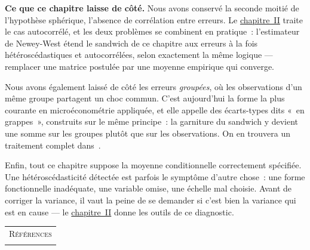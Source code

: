 \documentclass[10pt,a4paper]{article}
\newcommand{\siteurl}{https://le-mans.adjemian.eu/econometrics}
\newcommand{\chapref}[2]{\href{\siteurl/chapitre-#1.pdf}{chapitre~#2}}
\theoremstyle{definition}
\begin{document}
\begin{notes}

  \textbf{Ce que ce chapitre laisse de côté.} Nous avons conservé la seconde
  moitié de l'hypothèse sphérique, l'absence de corrélation entre erreurs. Le
  \chapref{2}{II} traite le cas autocorrélé, et les deux problèmes se combinent
  en pratique~: l'estimateur de Newey-West étend le sandwich de ce chapitre aux
  erreurs à la fois hétéroscédastiques et autocorrélées, selon exactement la
  même logique — remplacer une matrice postulée par une moyenne empirique qui
  converge.

  \bigskip

  Nous avons également laissé de côté les erreurs \emph{groupées}, où les
  observations d'un même groupe partagent un choc commun. C'est aujourd'hui la
  forme la plus courante en microéconométrie appliquée, et elle appelle des
  écarts-types dits «~en grappes~», construits sur le même principe~: la
  garniture du sandwich y devient une somme sur les groupes plutôt que sur les
  observations. On en trouvera un traitement complet dans~\cite{Greene2017}.

  \bigskip

  Enfin, tout ce chapitre suppose la moyenne conditionnelle correctement
  spécifiée. Une hétéroscédasticité détectée est parfois le symptôme d'autre
  chose~: une forme fonctionnelle inadéquate, une variable omise, une échelle
  mal choisie. Avant de corriger la variance, il vaut la peine de se demander
  si c'est bien la variance qui est en cause — le \chapref{2}{II} donne les
  outils de ce diagnostic.

\end{notes}


\begin{notes}

  \begin{center}
    \begin{tabular}{c}
      \\
      \Huge{\textsc{Références}}\\
      \\
    \end{tabular}
  \end{center}

  \bigskip

  \nocite{Greene2017}

  \nocite{Schmidt1976}

  \sloppy

\end{notes}
\end{document}
